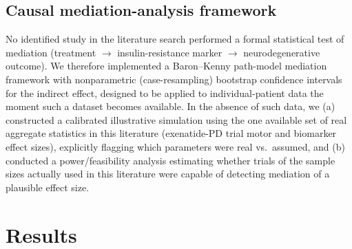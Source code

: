 \documentclass[11pt, a4paper]{article}
\begin{document}
\subsection{Causal mediation-analysis framework}
No identified study in the literature search performed a formal statistical
test of mediation (treatment $\rightarrow$ insulin-resistance marker
$\rightarrow$ neurodegenerative outcome). We therefore implemented a
Baron--Kenny path-model mediation framework with nonparametric
(case-resampling) bootstrap confidence intervals for the indirect effect,
designed to be applied to individual-patient data the moment such a dataset
becomes available. In the absence of such data, we (a) constructed a
calibrated illustrative simulation using the one available set of real
aggregate statistics in this literature (exenatide-PD trial motor and
biomarker effect sizes), explicitly flagging which parameters were real vs.\
assumed, and (b) conducted a power/feasibility analysis estimating whether
trials of the sample sizes actually used in this literature were capable of
detecting mediation of a plausible effect size.

\section{Results}
\label{sec:results}
\end{document}
